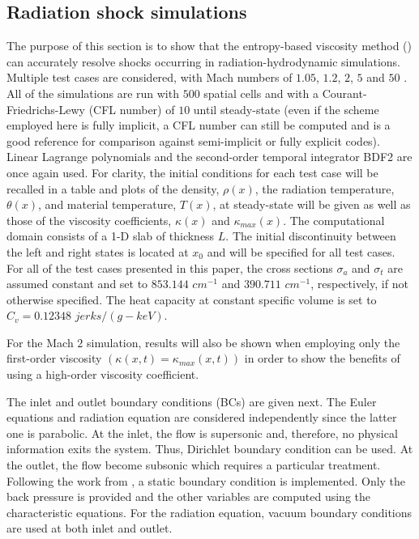 \subsection{Radiation shock simulations}
\label{sec:simulations}

The purpose of this section is to show that the entropy-based viscosity method () can accurately resolve shocks occurring in radiation-hydrodynamic simulations. Multiple test cases are considered, with Mach numbers of $1.05$, $1.2$, $2$, $5$ and $50$ \cite{LowrieEdwards}. All of the simulations are run with $500$ spatial cells and with a Courant-Friedrichs-Lewy (CFL number) of $10$ until steady-state (even if the scheme employed here is fully implicit, a CFL number can still be computed and is a good reference for comparison against semi-implicit or fully explicit codes). Linear Lagrange polynomials and the second-order temporal integrator BDF2 are once again used. For clarity, the initial conditions for each test case will be recalled in a table and plots of the density, $\rho (x)$, the radiation temperature, $\theta (x)$, and material temperature, $T(x)$,  at steady-state will be given as well as those of the viscosity coefficients, $\kappa(x)$ and $\kappa_{max}(x)$. The computational domain consists of a 1-D slab of thickness $L$. The initial discontinuity between the left and right states is located at $x_0$ and will be specified for all test cases. For all of the test cases presented in this paper, the cross sections $\sigma_a$ and $\sigma_t$ are assumed constant and set to $853.144$ $cm^{-1}$ and $390.711$ $cm^{-1}$, respectively, if not otherwise specified. The heat capacity at constant specific volume is set to $C_v = 0.12348$ $jerks/(g-keV)$.

For the Mach $2$ simulation, results will also be shown when employing only the first-order viscosity $(\kappa(x,t) = \kappa_{max}(x,t))$ in order to show the benefits of using a high-order viscosity coefficient. 

The inlet and outlet boundary conditions (BCs) are given next. The Euler equations and radiation equation are considered independently since the latter one is parabolic. At the inlet, the flow is supersonic and, therefore, no physical information exits the system. Thus, Dirichlet boundary condition can be used. At the outlet, the flow become subsonic which requires a particular treatment. Following the work from \cite{SEM}, a static boundary condition is implemented. Only the back pressure is provided and the other variables are computed using the characteristic equations. For the radiation equation, vacuum boundary conditions are used at both inlet and outlet.

